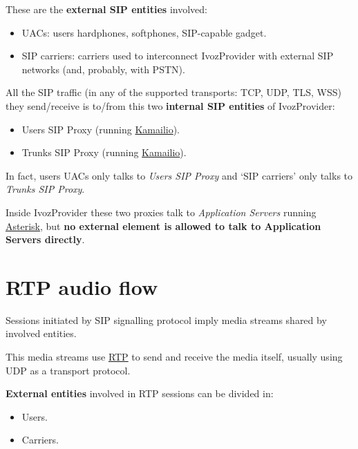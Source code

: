 \documentclass[letterpaper,10pt,english]{sphinxmanual}
\begin{document}
These are the \textbf{external SIP entities} involved:
\begin{itemize}
\item {} 
UACs: users hardphones, softphones, SIP-capable gadget.

\item {} 
SIP carriers: carriers used to interconnect IvozProvider with external SIP
networks (and, probably, with PSTN).

\end{itemize}

All the SIP traffic (in any of the supported transports: TCP, UDP, TLS, WSS)
they send/receive is to/from this two \textbf{internal SIP entities} of IvozProvider:
\begin{itemize}
\item {} 
Users SIP Proxy (running \href{https://www.kamailio.org}{Kamailio}).

\item {} 
Trunks SIP Proxy (running \href{https://www.kamailio.org}{Kamailio}).

\end{itemize}

In fact, users UACs only talks to \emph{Users SIP Proxy} and `SIP carriers' only talks
to \emph{Trunks SIP Proxy}.

Inside IvozProvider these two proxies talk to \emph{Application Servers} running
\href{http://www.asterisk.org/}{Asterisk}, but \textbf{no external element is allowed
to talk to Application Servers directly}.


\section{RTP audio flow}
\label{architecture/index:rtp-audio-flow}\label{architecture/index:audioflow}
Sessions initiated by SIP signalling protocol imply media streams shared by
involved entities.

This media streams use \href{https://tools.ietf.org/html/rfc3550}{RTP} to send and
receive the media itself, usually using UDP as a transport protocol.

\textbf{External entities} involved in RTP sessions can be divided in:
\begin{itemize}
\item {} 
Users.

\item {} 
Carriers.

\end{itemize}
\end{document}
